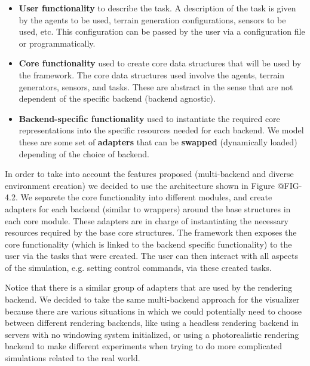 \begin{itemize}
    \item \textbf{User functionality} to describe the task. A description of the task is given by 
          the agents to be used, terrain generation configurations, sensors to be used, etc. This configuration
          can be passed by the user via a configuration file or programmatically.
    \item \textbf{Core functionality} used to create core data structures that will be used by the framework.
          The core data structures used involve the agents, terrain generators, sensors, and tasks. These are
          abstract in the sense that are not dependent of the specific backend (backend agnostic).
    \item \textbf{Backend-specific functionality} used to instantiate the required core representations
          into the specific resources needed for each backend. We model these are some set of \textbf{adapters}
          that can be \textbf{swapped} (dynamically loaded) depending of the choice of backend.
\end{itemize}

\figFrameworkFlow

In order to take into account the features proposed (multi-backend and diverse environment
creation) we decided to use the architecture shown in Figure @FIG-4.2. We separete the core
functionality into different modules, and create adapters for each backend (similar to wrappers) 
around the base structures in each core module. These adapters are in charge of instantiating the
necessary resources required by the base core structures. The framework then exposes the core
functionality (which is linked to the backend specific functionality) to the user via the tasks
that were created. The user can then interact with all aspects of the simulation, e.g. setting
control commands, via these created tasks.

Notice that there is a similar group of adapters that are used by the rendering backend. We
decided to take the same multi-backend approach for the visualizer because there are various situations
in which we could potentially need to choose between different rendering backends, like using a 
headless rendering backend in servers with no windowing system initialized, or using a photorealistic
rendering backend to make different experiments when trying to do more complicated simulations related to
the real world.

\figFrameworkArchitecture

